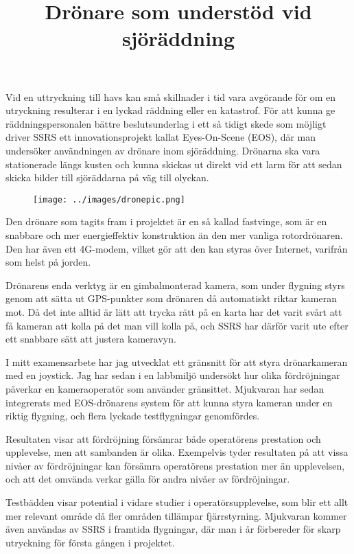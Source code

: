 \documentclass{popsci}
\title{Drönare som understöd vid sjöräddning}
\begin{document}

{\noindent Vid en uttryckning till havs kan små skillnader i tid vara avgörande för om en utryckning resulterar i en lyckad räddning eller en katastrof. För att kunna ge räddningspersonalen bättre beslutsunderlag i ett så tidigt skede som möjligt driver SSRS ett innovationsprojekt kallat Eyes-On-Scene (EOS), där man undersöker användningen av drönare inom sjöräddning. Drönarna ska vara stationerade längs kusten och kunna skickas ut direkt vid ett larm för att sedan skicka bilder till sjöräddarna på väg till olyckan.

\begin{figure}[!bth] %
    \texttt{[image: ../images/dronepic.png]} 
\end{figure}

Den drönare som tagits fram i projektet är en så kallad fastvinge, som är en snabbare och mer energieffektiv konstruktion än den mer vanliga rotordrönaren. Den har även ett 4G-modem, vilket gör att den kan styras över Internet, varifrån som helst på jorden. 

Drönarens enda verktyg är en gimbalmonterad kamera, som under flygning styrs genom att sätta ut GPS-punkter som drönaren då automatiskt riktar kameran mot. Då det inte alltid är lätt att trycka rätt på en karta har det varit svårt att få kameran att kolla på det man vill kolla på, och SSRS har därför varit ute efter ett snabbare sätt att justera kameravyn.

I mitt examensarbete har jag utvecklat ett gränsnitt för att styra drönarkameran med en joystick. Jag har sedan i en labbmiljö undersökt hur olika fördröjningar påverkar en kameraoperatör som använder gränsittet. Mjukvaran har sedan integrerats med EOS-drönarens system för att kunna styra kameran under en riktig flygning, och flera lyckade testflygningar genomfördes. 

Resultaten visar att fördröjning försämrar både operatörens prestation och upplevelse, men att sambanden är olika. Exempelvis tyder resultaten på att vissa nivåer av fördröjningar kan försämra operatörens prestation mer än upplevelsen, och att det omvända verkar gälla för andra nivåer av fördröjningar.

Testbädden visar potential i vidare studier i operatörsupplevelse, som blir ett allt mer relevant område då fler områden tillämpar fjärrstyrning. Mjukvaran kommer även användas av SSRS i framtida flygningar, där man i år förbereder för skarp utryckning för första gången i projektet.
}
\end{document}
